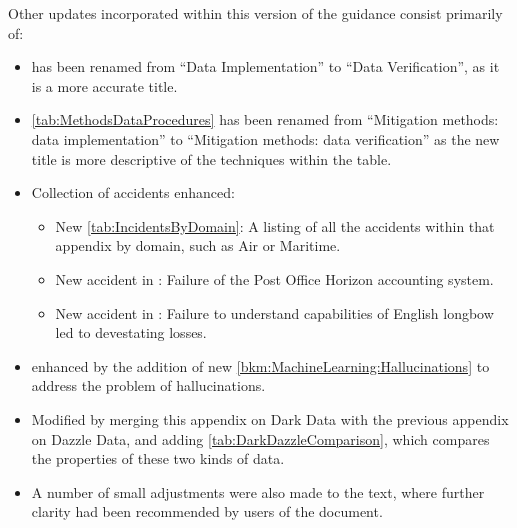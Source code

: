 Other updates incorporated within this version of the guidance consist primarily of:%
\begin{itemize}
\item {} has been renamed from
  ``Data Implementation'' to ``Data Verification'', as it is a more accurate title.
\item \autoref{tab:MethodsDataProcedures} has been renamed from
  ``Mitigation methods: data implementation'' to ``Mitigation methods: data verification''
  as the new title is more descriptive of the techniques within the table.
  \item Collection of accidents enhanced:
    \begin{itemize}
     \item New \autoref{tab:IncidentsByDomain}: A listing of all the accidents within that
       appendix by domain, such as Air or Maritime.
     \item New accident in : Failure of the Post Office Horizon accounting system.
     \item New accident in : Failure to understand capabilities of English longbow led to devestating losses.
     \end{itemize}
  \item {} enhanced by the addition of new
    \autoref{bkm:MachineLearning:Hallucinations} to address the problem of hallucinations.
   \item Modified  by merging this appendix on Dark Data with the previous appendix on Dazzle Data, and adding \autoref{tab:DarkDazzleComparison}, which compares the properties of these two kinds of data.

  \item A number of small adjustments were also made to the text,
  where further clarity had been recommended by users of the document. 
\end{itemize}

